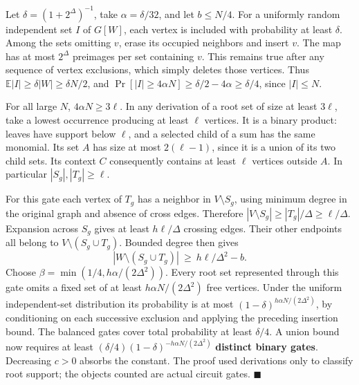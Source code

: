 \documentclass[
  11pt,
]{article}
\begin{document}
Let \(\delta=(1+2^\Delta)^{-1}\), take \(\alpha=\delta/32\), and let
\(b\le N/4\). For a uniformly random independent set \(I\) of \(G[W]\),
each vertex is included with probability at least \(\delta\). Among the
sets omitting \(v\), erase its occupied neighbors and insert \(v\). The
map has at most \(2^\Delta\) preimages per set containing \(v\). This
remains true after any sequence of vertex exclusions, which simply
deletes those vertices. Thus \(\mathbb E|I|\ge \delta|W|\ge\delta N/2\),
and \(\Pr[|I|\ge4\alpha N]\ge\delta/2-4\alpha\ge\delta/4\), since
\(|I|\le N\).

For all large \(N\), \(4\alpha N\ge3\ell\). In any derivation of a root
set of size at least \(3\ell\), take a lowest occurrence producing at
least \(\ell\) vertices. It is a binary product: leaves have support
below \(\ell\), and a selected child of a sum has the same monomial. Its
set \(A\) has size at most \(2(\ell-1)\), since it is a union of its two
child sets. Its context \(C\) consequently contains at least \(\ell\)
vertices outside \(A\). In particular \(|S_g|,|T_g|\ge\ell\).

For this gate each vertex of \(T_g\) has a neighbor in
\(V\setminus S_g\), using minimum degree in the original graph and
absence of cross edges. Therefore
\(|V\setminus S_g|\ge |T_g|/\Delta\ge\ell/\Delta\). Expansion across
\(S_g\) gives at least \(h\ell/\Delta\) crossing edges. Their other
endpoints all belong to \(V\setminus(S_g\cup T_g)\). Bounded degree then
gives \[
 |W\setminus(S_g\cup T_g)|\ \ge\ h\ell/\Delta^2-b.
\] Choose \(\beta=\min(1/4,h\alpha/(2\Delta^2))\). Every root set
represented through this gate omits a fixed set of at least
\(h\alpha N/(2\Delta^2)\) free vertices. Under the uniform
independent-set distribution its probability is at most
\((1-\delta)^{h\alpha N/(2\Delta^2)}\), by conditioning on each
successive exclusion and applying the preceding insertion bound. The
balanced gates cover total probability at least \(\delta/4\). A union
bound now requires at least
\((\delta/4)(1-\delta)^{-h\alpha N/(2\Delta^2)}\) \textbf{distinct
binary gates}. Decreasing \(c>0\) absorbs the constant. The proof used
derivations only to classify root support; the objects counted are
actual circuit gates. \(\blacksquare\)
\end{document}

